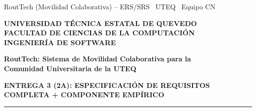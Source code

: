 \documentclass[12pt,a4paper]{article}
\newcommand{\Equipo}{Equipo CN}
\begin{document}
\color{DocText}
\justifying

\thispagestyle{empty}

\begin{center}
  {\scriptsize
  RoutTech (Movilidad Colaborativa) -- ERS/SRS
  \textbar\ UTEQ \textbar\ \Equipo}
\end{center}

\vspace{0.85cm}

\begin{center}
  {\normalsize\bfseries
  UNIVERSIDAD TÉCNICA ESTATAL DE QUEVEDO\\
  FACULTAD DE CIENCIAS DE LA COMPUTACIÓN\\
  INGENIERÍA DE SOFTWARE}
\end{center}

\vspace{2.35cm}

\begin{center}
  {\LARGE\bfseries\color{DocNavy}
  RoutTech: Sistema de Movilidad Colaborativa para la\\
  Comunidad Universitaria de la UTEQ}

  \vspace{0.55cm}
  {\normalsize\bfseries\color{DocGray}
  ENTREGA 3 (2A): ESPECIFICACIÓN DE REQUISITOS\\
  COMPLETA + COMPONENTE EMPÍRICO}
\end{center}

\vspace{0.38cm}
\noindent\color{DocNavy}\rule{\textwidth}{0.75pt}\color{DocText}
\vspace{0.72cm}
\end{document}
